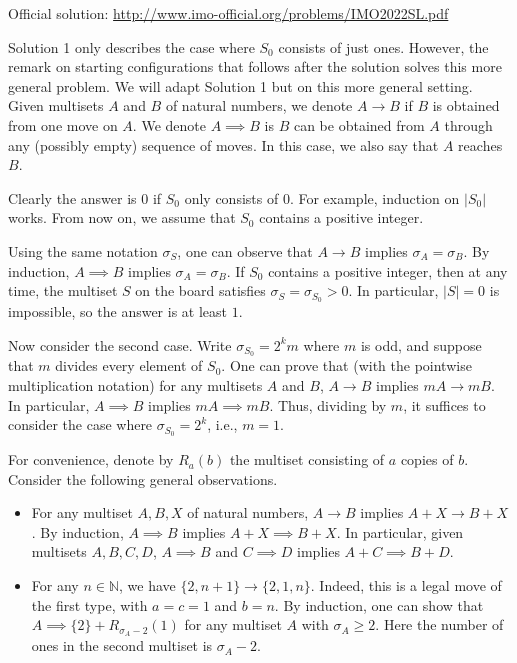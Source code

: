 \documentclass{article}
\newcommand{\N}{\mathbb{N}}
\begin{document}
Official solution: \url{http://www.imo-official.org/problems/IMO2022SL.pdf}

Solution 1 only describes the case where $S_0$ consists of just ones.
However, the remark on starting configurations that follows after the solution solves this more general problem.
We will adapt Solution 1 but on this more general setting.
Given multisets $A$ and $B$ of natural numbers, we denote $A \to B$ if $B$ is obtained from one move on $A$.
We denote $A \implies B$ is $B$ can be obtained from $A$ through any (possibly empty) sequence of moves.
In this case, we also say that $A$ reaches $B$.

Clearly the answer is $0$ if $S_0$ only consists of $0$.
For example, induction on $|S_0|$ works.
From now on, we assume that $S_0$ contains a positive integer.

Using the same notation $\sigma_S$, one can observe that $A \to B$ implies $\sigma_A = \sigma_B$.
By induction, $A \implies B$ implies $\sigma_A = \sigma_B$.
If $S_0$ contains a positive integer, then at any time, the multiset $S$ on the board satisfies $\sigma_S = \sigma_{S_0} > 0$.
In particular, $|S| = 0$ is impossible, so the answer is at least $1$.

Now consider the second case.
Write $\sigma_{S_0} = 2^k m$ where $m$ is odd, and suppose that $m$ divides every element of $S_0$.
One can prove that (with the pointwise multiplication notation) for any multisets $A$ and $B$, $A \to B$ implies $mA \to mB$.
In particular, $A \implies B$ implies $mA \implies mB$.
Thus, dividing by $m$, it suffices to consider the case where $\sigma_{S_0} = 2^k$, i.e., $m = 1$.

For convenience, denote by $R_a(b)$ the multiset consisting of $a$ copies of $b$.
Consider the following general observations.

\begin{itemize}

    \item
    For any multiset $A, B, X$ of natural numbers, $A \to B$ implies $A + X \to B + X$.
    By induction, $A \implies B$ implies $A + X \implies B + X$.
    In particular, given multisets $A, B, C, D$, $A \implies B$ and $C \implies D$ implies $A + C \implies B + D$.

    \item
    For any $n \in \N$, we have $\{2, n + 1\} \to \{2, 1, n\}$.
    Indeed, this is a legal move of the first type, with $a = c = 1$ and $b = n$.
    By induction, one can show that $A \implies \{2\} + R_{\sigma_A - 2}(1)$ for any multiset $A$ with $\sigma_A \geq 2$.
    Here the number of ones in the second multiset is $\sigma_A - 2$.

\end{itemize}
\end{document}
